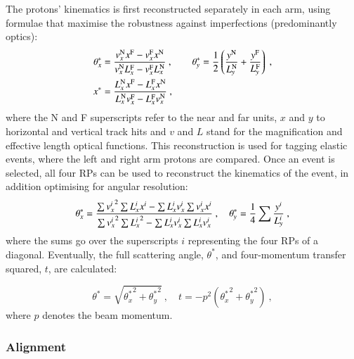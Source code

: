 The protons' kinematics is first reconstructed separately in each arm, using formulae that maximise the robustness against imperfections (predominantly optics):
\begin{equation}
\label{eq:kin 1a}
	\begin{aligned}
		\theta_x^* &= {v_x^{\rm N} x^{\rm F} - v_x^{\rm F} x^{\rm N}\over v_x^{\rm N} L_x^{\rm F} - v_x^{\rm F} L_x^{\rm N}}\ ,\qquad
		\theta_y^* = {1\over 2} \left( {y^{\rm N}\over L_y^{\rm N}} + {y^{\rm F}\over L_y^{\rm F}} \right)\ ,\\
		x^* &= {L_x^{\rm N} x^{\rm F} - L_x^{\rm F} x^{\rm N}\over L_x^{\rm N} v_x^{\rm F} - L_x^{\rm F} v_x^{\rm N}}\ , \\
	\end{aligned}
\end{equation}
where the N and F superscripts refer to the near and far units, $x$ and $y$ to horizontal and vertical track hits and $v$ and $L$ stand for the magnification and effective length optical functions. This reconstruction is used for tagging elastic events, where the left and right arm protons are compared. Once an event is selected, all four RPs can be used to reconstruct the kinematics of the event, in addition optimising for angular resolution:
\begin{equation}
\label{eq:kin 2a}
		\theta_x^* = {
				\sum {v_x^i}^2 \sum L_x^i x^i - \sum L_x^i v_x^i \sum v_x^i x^i
				\over
				\sum {v_x^i}^2 \sum {L_x^i}^2 - \sum L_x^i v_x^i \sum L_x^i v_x^i
			}\ ,\quad
		\theta_y^* = {1\over 4} \sum {y^i\over L_y^i}\ ,
\end{equation}
where the sums go over the superscripts $i$ representing the four RPs of a diagonal. Eventually, the full scattering angle, $\theta^*$, and four-momentum transfer squared, $t$, are calculated:

\begin{equation}
\label{eq:th t}
\theta^* = \sqrt{{\theta_x^*}^2 + {\theta_y^*}^2}\ ,\quad t = - p^2 ({\theta_x^*}^2 + {\theta_y^*}^2)\ ,
\end{equation}
where $p$ denotes the beam momentum.



\subsubsection{Alignment}
\label{sec:alignment}

